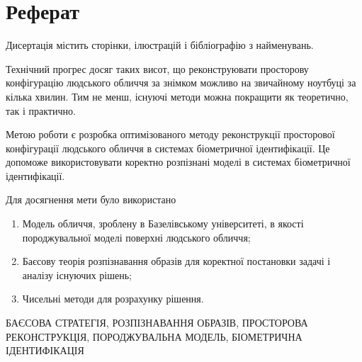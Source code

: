 \chapter*{Реферат}

Дисертація містить \pageref{LastPage} сторінки,
 ілюстрацій
і бібліографію з  найменувань.

Технічний прогрес досяг таких висот,
що реконструювати просторову конфігурацію людського обличчя за знімком
можливо на звичайному ноутбуці за кілька хвилин.
Тим не менш, існуючі методи можна покращити як теоретично, так і практично.

Метою роботи є
розробка оптимізованого методу реконструкції просторової конфігурації
людського обличчя в системах біометричної ідентифікації.
Це допоможе використовувати коректно розпізнані моделі
в системах біометричної ідентифікації.

Для досягнення мети було використано
\begin{enumerate}
  \item
    Модель обличчя, зроблену в Базелівському університеті,
    в якості породжувальної моделі поверхні людського обличчя;
  \item
    Баєсову теорія розпізнавання образів
    для коректної постановки задачі і аналізу існуючих рішень;
  \item
    Чисельні методи для розрахунку рішення.
\end{enumerate}

\MakeUppercase{баєсова стратегія, розпізнавання образів,
просторова реконструкція, породжувальна модель,
біометрична ідентифікація}

